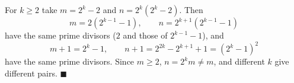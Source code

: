 For $k\ge2$ take $m=2^k-2$ and $n=2^k\left(2^k-2\right)$. Then
\[m=2\left(2^{k-1}-1\right),\qquad n=2^{k+1}\left(2^{k-1}-1\right)\]
have the same prime divisors ($2$ and those of $2^{k-1}-1$), and
\[m+1=2^k-1,\qquad n+1=2^{2k}-2^{k+1}+1=\left(2^k-1\right)^2\]
have the same prime divisors. Since $m\ge2$, $n=2^km\ne m$, and different $k$ give different pairs. $\blacksquare$
